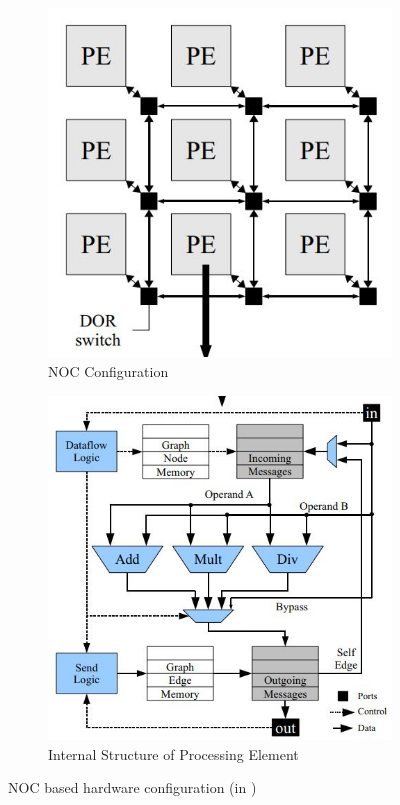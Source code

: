\begin{figure}[H]
    \centering
    \begin{subfigure}[b]{0.5\textwidth}
        \centering
        \includegraphics[width = 0.95\linewidth]{./ReviewLit/kapreArch1.JPG}
        \caption{NOC Configuration}
    \end{subfigure}%
    \begin{subfigure}[b]{0.5\textwidth}
        \centering
        \includegraphics[width = 0.95\linewidth]{./ReviewLit/kapreArch2.JPG}
        \caption{Internal Structure of Processing Element}
    \end{subfigure}
    \caption{NOC based hardware configuration (in \cite{Kapre})}
    \label{fig:Into:kapre}
\end{figure}
